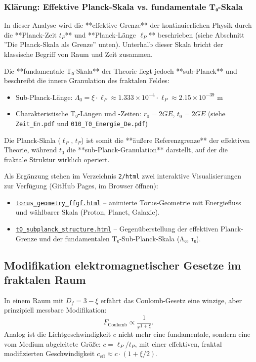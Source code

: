 \documentclass[12pt,a4paper]{article}
\begin{document}
	\subsubsection{Klärung: Effektive Planck-Skala vs. fundamentale T₀-Skala}
	In dieser Analyse wird die **effektive Grenze** der kontinuierlichen Physik durch die **Planck-Zeit \( t_P \)** und **Planck-Länge \(\ell_P\)** beschrieben (siehe Abschnitt ''Die Planck-Skala als Grenze'' unten). Unterhalb dieser Skala bricht der klassische Begriff von Raum und Zeit zusammen.
	
	Die **fundamentale T₀-Skala** der Theorie liegt jedoch **sub-Planck** und beschreibt die innere Granulation des fraktalen Feldes:
	\begin{itemize}
		\item Sub-Planck-Länge: \(\Lambda_0 = \xi \cdot \ell_P \approx 1.333 \times 10^{-4} \cdot \ell_P \approx 2.15 \times 10^{-39} \) m
		\item Charakteristische T₀-Längen und -Zeiten: \( r_0 = 2GE \), \( t_0 = 2GE \) (siehe \texttt{Zeit\_En.pdf} und \texttt{010\_T0\_Energie\_De.pdf})
	\end{itemize}
	
	Die Planck-Skala (\(\ell_P\), \( t_P \)) ist somit die **äußere Referenzgrenze** der effektiven Theorie, während \( t_0 \) die **sub-Planck-Granulation** darstellt, auf der die fraktale Struktur wirklich operiert.
	
	Als Ergänzung stehen im Verzeichnis \texttt{2/html} zwei interaktive Visualisierungen zur Verfügung (GitHub Pages, im Browser öffnen):
	\begin{itemize}
		\item \href{https://jpascher.github.io/T0-Time-Mass-Duality/2/html/torus_geometry_ffgf.html}{\texttt{torus\_geometry\_ffgf.html}} – animierte Torus-Geometrie mit Energiefluss und wählbarer Skala (Proton, Planet, Galaxie).
		\item \href{https://jpascher.github.io/T0-Time-Mass-Duality/2/html/t0_subplanck_structure.html}{\texttt{t0\_subplanck\_structure.html}} – Gegenüberstellung der effektiven Planck-Grenze und der fundamentalen T₀-Sub-Planck-Skala (Λ₀, τ₀).
	\end{itemize}
	
	\subsection{Modifikation elektromagnetischer Gesetze im fraktalen Raum}
	In einem Raum mit \(D_f = 3-\xi\) erfährt das Coulomb-Gesetz eine winzige, aber prinzipiell messbare Modifikation:
	\begin{equation}
		F_{\text{Coulomb}} \propto \frac{1}{r^{1 + \xi}}.
		\label{eq:fractal_coulomb}
	\end{equation}
	Analog ist die Lichtgeschwindigkeit \(c\) nicht mehr eine fundamentale, sondern eine vom Medium abgeleitete Größe: \(c = \ell_P / t_P\), mit einer effektiven, fraktal modifizierten Geschwindigkeit \(c_{\text{eff}} \approx c \cdot (1 + \xi/2)\).
	
\end{document}
